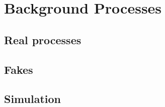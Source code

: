 \chapter{Background Processes\label{ch:backgrounds}}

\section{Real processes\label{sec:realbgd}}

\section{Fakes\label{sec:fakebgd}}

\section{Simulation\label{sec:bkgsim}}

